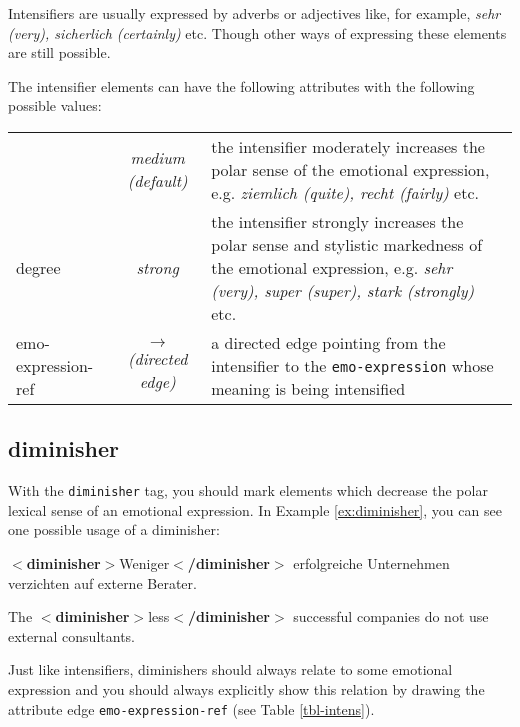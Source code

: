 \documentclass[11pt,a4paper]{article}
\newcommand{\xmltag}[1]{{\textbf{\small$<$#1$>$}}}
\newcommand{\diminisher}[1]{\xmltag{diminisher}#1\xmltag{/diminisher}}
\newlength\clmnwidth
\newenvironment{myexe}{
  \begin{exe}
    \ex\begin{center}
    \itshape
}{
    \end{center}
  \end{exe}
}
\begin{document}
Intensifiers are usually expressed by adverbs or adjectives like, for example,
\textit{sehr (very), sicherlich (certainly)} etc.  Though other ways of
expressing these elements are still possible.

The intensifier elements can have the following attributes with the
following possible values:
\begin{center}
  \begin{tabular}{|l|c|p{\clmnwidth}|}\hline\label{tbl-intens}

    & \textit{medium (default)} & the intensifier moderately increases
    the polar sense of the emotional expression, e.g. \textit{ziemlich
      (quite), recht (fairly)} etc.\\\cline{2-3}

    \multirow{-2}{*}{degree} & \textit{strong} & the intensifier
    strongly increases the polar sense and stylistic markedness of the
    emotional expression, e.g. \textit{sehr (very), super (super),
      stark (strongly)} etc.\\\hline


    emo-expression-ref & \textit{$\longrightarrow$\newline(directed
      edge)} & a directed edge pointing from the intensifier to the
    \texttt{emo-expression} whose meaning is being intensified\\\hline
  \end{tabular}
\end{center}

\subsection{diminisher}
With the \texttt{diminisher} tag, you should mark elements which decrease the
polar lexical sense of an emotional expression.  In Example
\ref{ex:diminisher}, you can see one possible usage of a diminisher:
\begin{myexe}
  \diminisher{Weniger} erfolgreiche Unternehmen verzichten auf externe
  Berater.\label{ex:diminisher}

  The \diminisher{less} successful companies do not use external
  consultants.
\end{myexe}
Just like intensifiers, diminishers should always relate to some emotional
expression and you should always explicitly show this relation by drawing the
attribute edge \texttt{emo-expression-ref} (see Table \ref{tbl-intens}).
\end{document}
